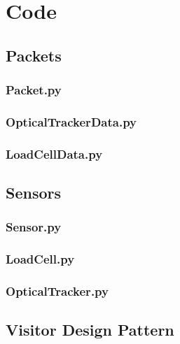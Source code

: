 \section{Code}

\subsection{Packets}

\subsubsection{Packet.py}
\lstset{language=Python}

\pagebreak

\subsubsection{OpticalTrackerData.py}
\lstset{language=Python}

\pagebreak

\subsubsection{LoadCellData.py}
\lstset{language=Python}

\pagebreak

\subsection{Sensors}

\subsubsection{Sensor.py}
\lstset{language=Python}

\pagebreak

\subsubsection{LoadCell.py}
\lstset{language=Python}

\pagebreak

\subsubsection{OpticalTracker.py}
\lstset{language=Python}

\pagebreak


\subsection{Visitor Design Pattern}

